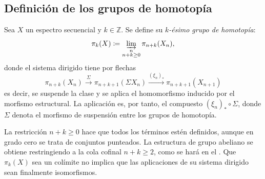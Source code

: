 
\subsection{Definición de los grupos de homotopía}

\begin{defi}\label{defi:pi-espectro}
Sea $X$ un espectro secuencial y $k\in\mathbb Z$. Se define su \emph{$k$-ésimo grupo de homotopía}:
\[
\pi_k(X)\coloneqq\varinjlim_{\substack{n\\ n+k\ge0}}\pi_{n+k}(X_n),
\]
donde el sistema dirigido tiene por flechas
\[
\pi_{n+k}(X_n) \xrightarrow{\Sigma} \pi_{n+k+1}(\Sigma X_n) \xrightarrow{(\xi_n)_*} \pi_{n+k+1}(X_{n+1})
\]
es decir, se suspende la clase y se aplica el homomorfismo inducido por el morfismo estructural. La aplicación es, por tanto, el compuesto $(\xi_n)_*\circ\Sigma$, donde $\Sigma$ denota el morfismo de suspensión entre los grupos de homotopía.
\end{defi}

La restricción $n+k\ge0$ hace que todos los términos estén definidos, aunque en grado cero se trata de conjuntos punteados. La estructura de grupo abeliano se obtiene restringiendo a la cola cofinal $n+k\ge2$, como se hará en el .
Que $\pi_k(X)$ sea un colímite no implica que las aplicaciones de su sistema dirigido sean finalmente isomorfismos.


